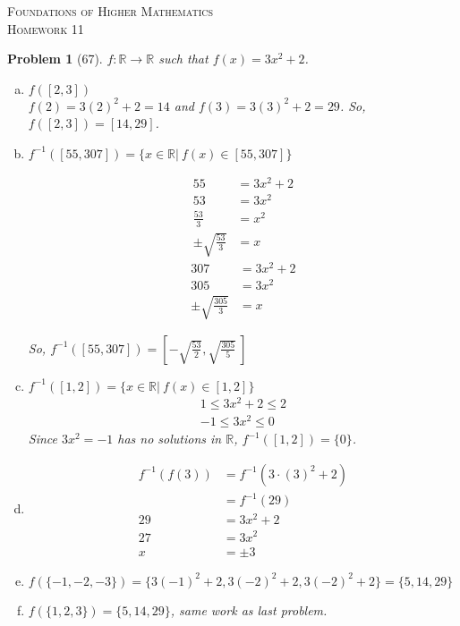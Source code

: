 \documentclass{article}
\theoremstyle{problem}
\newtheorem{prob}{Problem}
\theoremstyle{plain}
\theoremstyle{remark}
\begin{document}
\begin{center}
\textsc{\Large Foundations of Higher Mathematics}\\[.3cm]
\textsc{\Large Homework 11}
\end{center}

\begin{prob}[67] $f: \mathbb{R} \to \mathbb{R}$ such that $f(x) = 3x^2 + 2$.
\begin{enumerate}[a)]
\item $f([2,3])$\\
$f(2) = 3(2)^2 + 2 = 14$ and $f(3) = 3(3)^2 + 2 = 29$.
So, $f([2,3]) = [14,29]$.
\item $f^{-1}([55,307]) = \{ x \in \mathbb{R}|\ f(x) \in [55,307]\}$\\
\begin{multicols}{2}
\begin{align*}
  55 &= 3x^2 + 2\\
  53 &= 3x^2\\
  \frac{53}{3} &= x^2\\
  \pm \sqrt{\frac{53}{3}} &= x
\end{align*}
\vfill
\columnbreak
\begin{align*}
  307 &= 3x^2 + 2\\
  305 &= 3x^2\\
  \pm \sqrt{\frac{305}{3}} &= x
\end{align*}
\end{multicols}
So, $f^{-1}([55,307]) = \left [-\sqrt{\frac{53}{2}}, \sqrt{\frac{305}{5}}\  \right ] $
\item $f^{-1}([1,2]) = \{x \in \mathbb{R}|\ f(x) \in [1,2]\}$\\
\begin{align*}
  1 \leq 3x^2 + 2 \leq 2\\
  -1 \leq 3x^2 \leq 0
\end{align*}
Since $3x^2 = -1$ has no solutions in $\mathbb{R}$, $f^{-1}([1,2]) = \{0\}$.
\item \begin{align*}
    f^{-1}(f(3)) &= f^{-1}(3\cdot (3)^2 + 2)\\
    &= f^{-1}(29)\\
    29 &= 3x^2 + 2\\
    27 &= 3x^2\\
    x &= \pm 3
  \end{align*}  

\item $f(\{-1, -2, -3\}) = \{3(-1)^2 + 2, 3(-2)^2 + 2, 3(-2)^2 + 2\} = \{5, 14, 29\}$

\item $f(\{1, 2, 3\}) = \{5, 14, 29\}$, same work as last problem.
\end{enumerate}
\end{prob}
\end{document}

